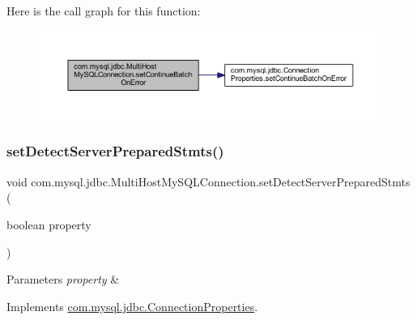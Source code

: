 Here is the call graph for this function\+:
\nopagebreak
\begin{figure}[H]
\begin{center}
\leavevmode
\includegraphics[width=350pt]{classcom_1_1mysql_1_1jdbc_1_1_multi_host_my_s_q_l_connection_a99f0b12351ec3cb5353af259a71bae1c_cgraph}
\end{center}
\end{figure}
\mbox{\label{classcom_1_1mysql_1_1jdbc_1_1_multi_host_my_s_q_l_connection_a9bc00ee02ec2cb57883a27ac982ed215}} 
\subsubsection{\texorpdfstring{set\+Detect\+Server\+Prepared\+Stmts()}{setDetectServerPreparedStmts()}}
{\footnotesize\ttfamily void com.\+mysql.\+jdbc.\+Multi\+Host\+My\+S\+Q\+L\+Connection.\+set\+Detect\+Server\+Prepared\+Stmts (\begin{DoxyParamCaption}\item[{boolean}]{property }\end{DoxyParamCaption})}


\begin{DoxyParams}{Parameters}
{\em property} & \\
\hline
\end{DoxyParams}


Implements \mbox{\hyperlink{interfacecom_1_1mysql_1_1jdbc_1_1_connection_properties_aadfec3198248406f73aea1a634fc3839}{com.\+mysql.\+jdbc.\+Connection\+Properties}}.

